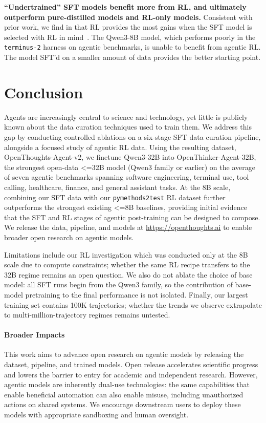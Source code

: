 \documentclass{article}
\begin{document}
\textbf{``Undertrained'' SFT models benefit more from RL, and ultimately outperform pure-distilled models and RL-only models.} Consistent with prior work, we find in  that RL provides the most gains when the SFT model is selected with RL in mind~\citep{kang2025quagmiressftrlposttraininghigh}. The Qwen3-8B model, which performs poorly in the \texttt{terminus-2} harness on agentic benchmarks, is unable to benefit from agentic RL. The model SFT'd on a smaller amount of data provides the better starting point.

\section{Conclusion}
\label{sec:conclusion}

Agents are increasingly central to science and technology, yet little is publicly known about the data curation techniques used to train them.
We address this gap by conducting controlled ablations on a six-stage SFT data curation pipeline, alongside a focused study of agentic RL data. Using the resulting dataset, OpenThoughts-Agent-v2, we finetune Qwen3-32B into OpenThinker-Agent-32B, the strongest open-data <=32B model (Qwen3 family or earlier) on the average of seven agentic benchmarks spanning software engineering, terminal use, tool calling, healthcare, finance, and general assistant tasks. At the 8B scale, combining our SFT data with our \texttt{pymethods2test} RL dataset further outperforms the strongest existing <=8B baselines, providing initial evidence that the SFT and RL stages of agentic post-training can be designed to compose. 
We release the data, pipeline, and models at \url{https://openthoughts.ai} to enable broader open research on agentic models.

Limitations include our RL investigation which was conducted only at the 8B scale due to compute constraints; whether the same RL recipe transfers to the 32B regime remains an open question.  We also do not ablate the choice of base model: all SFT runs begin from the Qwen3 family, so the contribution of base-model pretraining to the final performance is not isolated. Finally, our largest training set contains 100K trajectories; whether the trends we observe extrapolate to multi-million-trajectory regimes remains untested.

\paragraph{Broader Impacts}
This work aims to advance open research on agentic models by releasing the dataset, pipeline, and trained models. Open release accelerates scientific progress and lowers the barrier to entry for academic and independent research. However, agentic models are inherently dual-use technologies: the same capabilities that enable beneficial automation can also enable misuse, including unauthorized actions on shared systems. We encourage downstream users to deploy these models with appropriate sandboxing and human oversight.
\end{document}
